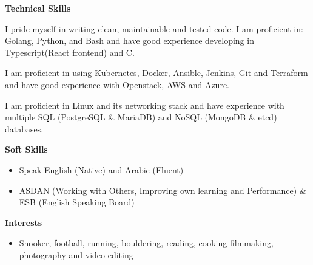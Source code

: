 \documentclass[11pt,a4paper]{article}
\begin{document}
\begin{minipage}[t]{0.48\textwidth}
\textbf{Technical Skills}

I pride myself in writing clean, maintainable and tested code. I am proficient in: Golang, Python, and Bash and have good experience developing in Typescript(React frontend) and C.

I am proficient in using Kubernetes, Docker, Ansible, Jenkins, Git and Terraform and have good experience with Openstack, AWS and Azure.

I am proficient in Linux and its networking stack and have experience with multiple SQL (PostgreSQL \& MariaDB) and NoSQL (MongoDB \& etcd) databases.
\end{minipage}%
\hfill
\begin{minipage}[t]{0.48\textwidth}
\textbf{Soft Skills}
\begin{itemize}[leftmargin=15pt, itemsep=2pt]
    \item Speak English (Native) and Arabic (Fluent)
    \item ASDAN (Working with Others, Improving own learning and Performance) \& ESB (English Speaking Board)
\end{itemize}

\textbf{Interests}
\begin{itemize}[leftmargin=15pt, itemsep=2pt]
    \item Snooker, football, running, bouldering, reading, cooking filmmaking, photography and video editing
\end{itemize}

\end{minipage}
\end{document}
